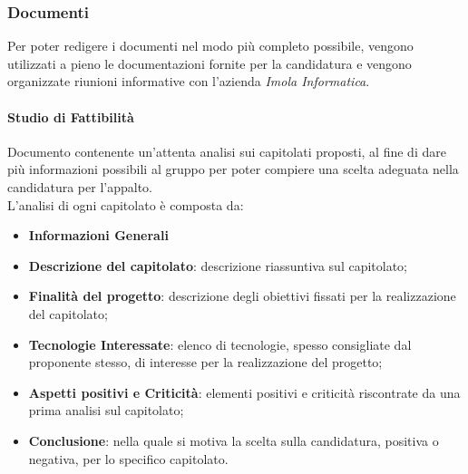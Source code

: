 \subsubsection{Documenti}
Per poter redigere i documenti nel modo più completo possibile, vengono utilizzati a pieno le documentazioni fornite per la candidatura e vengono organizzate riunioni informative con l'azienda  \textit{Imola Informatica}.
    
    \paragraph{Studio di Fattibilità}  \hfill \break
     Documento contenente un'attenta analisi sui capitolati proposti, al fine di dare più informazioni possibili al gruppo per poter compiere una scelta adeguata nella candidatura per l'appalto. \\
     L'analisi di ogni capitolato è composta da:
     \begin{itemize}
         \item \textbf{Informazioni Generali}
         \item \textbf{Descrizione del capitolato}: descrizione riassuntiva sul capitolato;
        \item \textbf{Finalità del progetto}: descrizione degli obiettivi fissati per la realizzazione del capitolato;
         \item \textbf{Tecnologie Interessate}: elenco di tecnologie, spesso consigliate dal proponente stesso, di interesse per la realizzazione del progetto;
         \item \textbf{Aspetti positivi e Criticità}: elementi positivi e criticità riscontrate da una prima analisi sul capitolato;
         \item \textbf{Conclusione}: nella quale si motiva la scelta sulla candidatura, positiva o negativa, per lo specifico capitolato.
    \end{itemize} 
     
